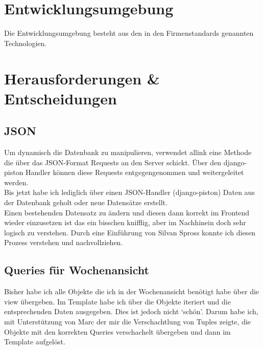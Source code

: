 \section{Entwicklungsumgebung}
Die Entwicklungsumgebung besteht aus den in den Firmenstandards genannten Technologien.
\section{Herausforderungen \& Entscheidungen}
\subsection{JSON}
Um dynamisch die Datenbank zu manipulieren, verwendet allink eine Methode die über das JSON-Format Requests an den Server schickt. 
Über den django-piston Handler können diese Requests entgegengenommen und weitergeleitet werden.\\
Bis jetzt habe ich lediglich über einen JSON-Handler (django-piston) Daten aus der Datenbank geholt oder neue Datensätze erstellt.\\
Einen bestehenden Datensatz zu ändern und diesen dann korrekt im Frontend wieder einzusetzen ist das ein bisschen knifflig, aber im Nachhinein doch sehr logisch zu verstehen.
Durch eine Einführung von Silvan Spross konnte ich diesen Prozess verstehen und nachvollziehen.
\subsection{Queries für Wochenansicht}
Bisher habe ich alle Objekte die ich in der Wochenansicht benötigt habe über die view übergeben.
Im Template habe ich über die Objekte iteriert und die entsprechenden Daten ausgegeben. Dies ist jedoch nicht `schön'. 
Darum habe ich, mit Unterstützung von Marc der mir die Verschachtlung von Tuples zeigte, die Objekte mit den korrekten Queries verschachelt übergeben und dann im Template aufgelöst.
